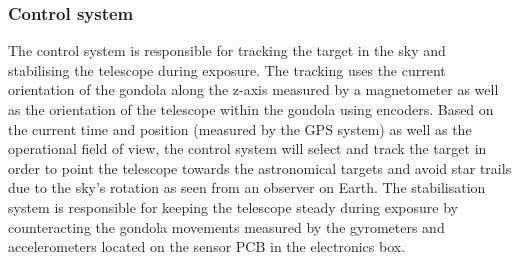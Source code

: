 \subsubsection{Control system}
The control system is responsible for tracking the target in the sky and stabilising the telescope during exposure. The tracking uses the current orientation of the gondola along the z-axis measured by a magnetometer as well as the orientation of the telescope within the gondola using encoders. Based on the current time and position (measured by the GPS system) as well as the operational field of view, the control system will select and track the target in order to point the telescope towards the astronomical targets and avoid star trails due to the sky's rotation as seen from an observer on Earth. The stabilisation system is responsible for keeping the telescope steady during exposure by counteracting the gondola movements measured by the gyrometers and accelerometers located on the sensor PCB in the electronics box.




















































\raggedbottom